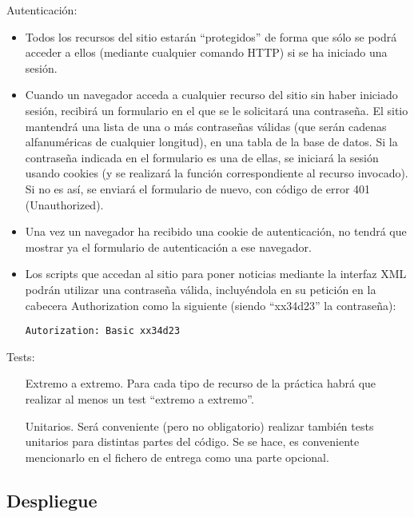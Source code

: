 Autenticación:

\begin{itemize}
\item Todos los recursos del sitio estarán ``protegidos'' de forma que sólo se podrá acceder a ellos (mediante cualquier comando HTTP) si se ha iniciado una sesión.
  
\item Cuando un navegador acceda a cualquier recurso del sitio sin haber iniciado sesión, recibirá un formulario en el que se le solicitará una contraseña. El sitio mantendrá una lista de una o más contraseñas válidas (que serán cadenas alfanuméricas de cualquier longitud), en una tabla de la base de datos. Si la contraseña indicada en el formulario es una de ellas, se iniciará la sesión usando cookies (y se realizará la función correspondiente al recurso invocado). Si no es así, se enviará el formulario de nuevo, con código de error 401 (Unauthorized).

\item Una vez un navegador ha recibido una cookie de autenticación, no tendrá que mostrar ya el formulario de autenticación a ese navegador.
  
\item Los scripts que accedan al sitio para poner noticias mediante la interfaz XML podrán utilizar una contraseña válida, incluyéndola en su petición en la cabecera Authorization como la siguiente (siendo ``xx34d23'' la contraseña):

\begin{verbatim}
Autorization: Basic xx34d23
\end{verbatim}

\end{itemize}

Tests:

\begin{itemize}
\item[Extremo a extremo.] Para cada tipo de recurso de la práctica habrá que realizar al menos un test ``extremo a extremo''.
\item[Unitarios.] Será conveniente (pero no obligatorio) realizar también tests unitarios para distintas partes del código. Se se hace, es conveniente mencionarlo en el fichero de entrega como una parte opcional.
\end{itemize}

\subsection{Despliegue}
\label{sec:practica-2023-05:despliegue}

